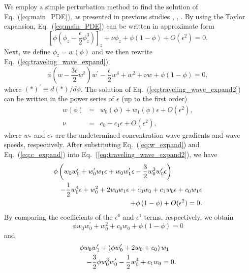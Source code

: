 \documentclass[jkps,preprint,fleqn,showpacs,showkeys]{revtex4}
\newcommand{\eq}[1]{Eq.~(\ref{#1})}
\newcommand{\Order}[1]{O(#1)}
\begin{document}
We employ a simple perturbation method to find the solution of \eq{eq:main_PDE}, as presented in previous studies \cite{Murray1989}, \cite{Sanchezgarduno1994}, \cite{Ngamsaad2016}. By using the Taylor expansion, \eq{eq:main_PDE} can be written in approximate form
\begin{equation}\label{eq:traveling_wave_expand}
\left[\phi\left(\phi_z-\frac{\epsilon}{2}\phi_z^3\right)\right]_z + \nu\phi_z + \phi\left(1-\phi\right) + \Order{\epsilon^2} = 0.
\end{equation}
Next, we define $\phi_z = w(\phi)$ and we then rewrite \eq{eq:traveling_wave_expand}
\begin{equation}\label{eq:traveling_wave_expand2}
\phi\left(w-\frac{3\epsilon}{2}w^3\right) w^\prime -\frac{\epsilon}{2}w^4 + w^2 + \nu w + \phi\left(1-\phi\right) = 0,
\end{equation}
where $(*)^\prime \equiv d(*)/d\phi$. The solution of \eq{eq:traveling_wave_expand2} can be written in the power series of $\epsilon$ (up to the first order)
\begin{eqnarray}
\label{eq:w_expand}
w(\phi) &=& w_0(\phi) + w_1(\phi)\epsilon + \Order{\epsilon^2}, \\
\label{eq:c_expand}
\nu &=& c_0 + c_1 \epsilon + \Order{\epsilon^2},
\end{eqnarray}
where $w_*$ and $c_*$ are the undetermined concentration wave gradients and wave speeds, respectively. After substituting \eq{eq:w_expand} and \eq{eq:c_expand} into \eq{eq:traveling_wave_expand2}, we have
\begin{eqnarray}\label{eq:traveling_wave_serie}
\lefteqn{
\phi\left(w_0 w_0^\prime  + w_0^\prime w_1\epsilon + w_0 w_1^\prime\epsilon -\frac{3}{2}w_0^3 w_0^\prime\epsilon\right)
}\nonumber\\
&& -\frac{1}{2}w_0^4\epsilon + w_0^2 + 2w_0w_1\epsilon + c_0w_0 + c_1w_0\epsilon + c_0w_1\epsilon \nonumber\\
&& + \phi\left(1-\phi\right) + \Order{\epsilon^2} = 0.
\end{eqnarray}
By comparing the coefficients of the $\epsilon^0$ and $\epsilon^1$ terms, respectively, we obtain
\begin{equation}\label{eq:zeroth_order}
\phi w_0 w_0^\prime + w_0^2 + c_0w_0 + \phi\left(1-\phi\right) = 0
\end{equation}
and 
\begin{eqnarray}\label{eq:first_order}
\lefteqn{
\phi w_0 w_1^\prime + \left(\phi w_0^\prime +2w_0 + c_0\right) w_1 
} \nonumber\\
&& -\frac{3}{2}\phi w_0^3 w_0^\prime -\frac{1}{2}w_0^4 + c_1w_0 = 0.
\end{eqnarray}
\end{document}

